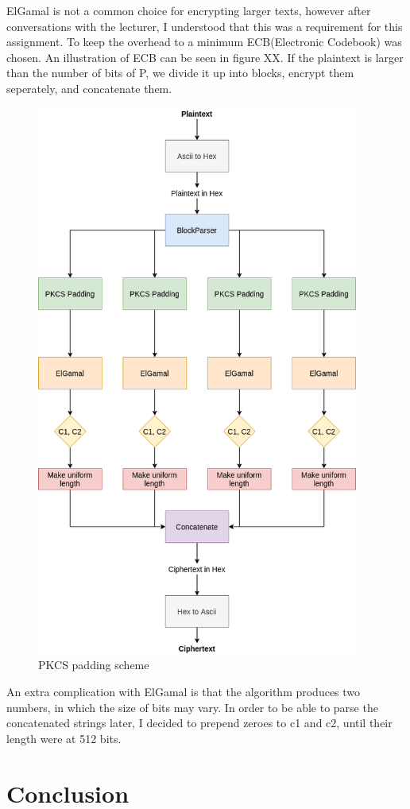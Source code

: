 \documentclass{article}
\begin{document}
ElGamal is not a common choice for encrypting larger texts, however after conversations with the lecturer, I understood that this was a requirement for this assignment. To keep the overhead to a minimum ECB(Electronic Codebook) was chosen. An illustration of ECB can be seen in figure XX. If the plaintext is larger than the number of bits of P, we divide it up into blocks, encrypt them seperately, and concatenate them. 


\begin{figure}[H]
 \centering
  \includegraphics[width=300pt]{img/overview.png}
 \caption{PKCS padding scheme}
 \end{figure}

An extra complication with ElGamal is that the algorithm produces two numbers, in which the size of bits may vary. In order to be able to parse the concatenated strings later, I decided to prepend zeroes to c1 and c2, until their length were at 512 bits.
\section{Conclusion}
\end{document}

